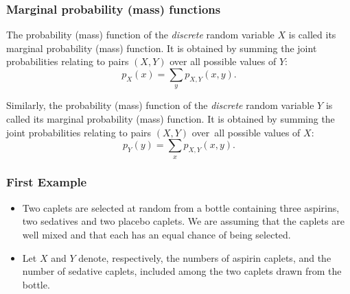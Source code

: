 \documentclass[notes=show,handout]{beamer}\usepackage[]{graphicx}\usepackage[]{color}
\newenvironment{stepitemize}{\begin{itemize}[<+->]}{\end{itemize} }
\begin{document}
\begin{frame}%
\frametitle{Marginal probability (mass) functions}

\begin{definition}
The probability (mass) function of the \emph{discrete} random variable
$X$ is called its marginal probability (mass) function. It is obtained by summing the joint probabilities relating to pairs $%
(X,Y)$ over all possible values of $Y$:%
\begin{equation*}
p_{X}(x)=\sum_{y}p_{X,Y}(x,y).
\end{equation*}

Similarly, the probability (mass) function of the \emph{discrete}
random variable $Y$ is called its marginal probability (mass) function. It is obtained by summing the joint probabilities relating to pairs $%
(X,Y)$ over\emph{\ }all possible values of $X$:%
\begin{equation*}
p_{Y}(y)=\sum_{x}p_{X,Y}(x,y).
\end{equation*}
\end{definition}
\end{frame}%


\begin{frame}%

\frametitle{First Example }

\begin{example}
\begin{stepitemize}
\item Two caplets are selected at random from a bottle containing three
aspirins, two sedatives and two placebo caplets. We are assuming that the caplets are well mixed and that each has an
equal chance of being selected.

\item Let $X$ and $Y$ denote, respectively, the numbers of aspirin caplets,
and the number of sedative caplets, included among the two caplets drawn
from the bottle.
%
%
\end{stepitemize}
\end{example}

\end{frame}%
\end{document}
